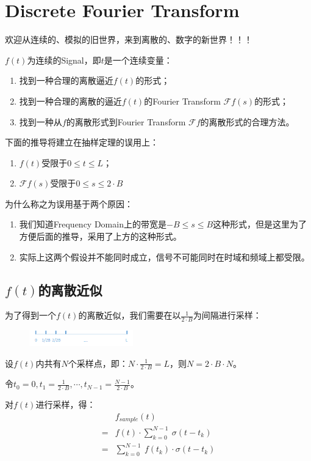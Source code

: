 \section{Discrete Fourier Transform}
欢迎从连续的、模拟的旧世界，来到离散的、数字的新世界！！！

$f(t)$为连续的Signal，即$t$是一个连续变量：
\begin{enumerate}
	\item 找到一种合理的离散逼近$f(t)$的形式；
	\item 找到一种合理的离散的逼近$f(t)$的Fourier Transform $\mathcal{F}f(s)$的形式；
	\item 找到一种从$f$的离散形式到Fourier Transform $\mathcal{F}f$的离散形式的合理方法。
\end{enumerate}

下面的推导将建立在抽样定理的误用上：
\begin{enumerate}
	\item $f(t)$受限于$0\leq t\leq L$；
	\item $\mathcal{F}f(s)$受限于$0\leq s\leq 2\cdot B$
\end{enumerate}

为什么称之为误用基于两个原因：
\begin{enumerate}
	\item 我们知道Frequency Domain上的带宽是$-B\leq s\leq B$这种形式，但是这里为了方便后面的推导，采用了上方的这种形式。
	\item 实际上这两个假设并不能同时成立，信号不可能同时在时域和频域上都受限。
\end{enumerate}

\subsection{$f(t)$的离散近似}
为了得到一个$f(t)$的离散近似，我们需要在以$\frac{1}{2\cdot B}$为间隔进行采样：
\begin{figure}[H]
	\centering
	\includegraphics[width=0.4\textwidth]{assets/DFT1.png}
\end{figure}
设$f(t)$内共有$N$个采样点，即：$N\cdot \frac{1}{2\cdot B}=L$，则$N=2\cdot B\cdot N$。

令$t_0=0,t_1=\frac{1}{2\cdot B},\cdots,t_{N-1}=\frac{N-1}{2\cdot B}$。

对$f(t)$进行采样，得：
\begin{align*}
	  & f_{sample}(t)                                      \\
	= & f(t)\cdot \sum\limits_{k=0}^{N-1}\ \sigma(t-t_k)   \\
	= & \sum\limits_{k=0}^{N-1}\ f(t_k)\cdot \sigma(t-t_k)
\end{align*}

